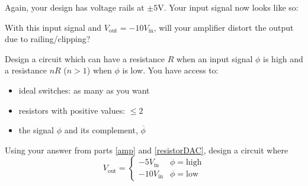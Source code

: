 \begin{enumerate}
\qitem\label{yes_rail}{
	Again, your design has voltage rails at $\pm 5\si{\volt}$. Your input signal now looks like so:
	\begin{center}
		
	\end{center}
	With this input signal and $V_\text{out} = -10V_\text{in}$, will your amplifier  distort the output due to railing/clipping?}

\empt{\vspace{1.5cm}}


\qitem\label{resistorDAC}{
	Design a circuit which can have a resistance $R$ when an input signal $\phi$ is high and a resistance $nR$ ($n > 1$) when $\phi$ is low. You have access to:
	\begin{itemize}
		\item ideal switches: as many as you want
		\item resistors with positive values: $\leq 2$
		\item the signal $\phi$ and its complement, $\overline{\phi}$
	\end{itemize}}

\empt{\vspace{4cm}}


\qitem\label{vga}{
	Using your answer from parts \ref{amp} and \ref{resistorDAC}, design a circuit where
	$$V_\text{out} = \begin{cases}
						-5V_\text{in} & \phi = \text{high}\\
						-10V_\text{in} & \phi = \text{low}
					\end{cases}$$}


\end{enumerate}
